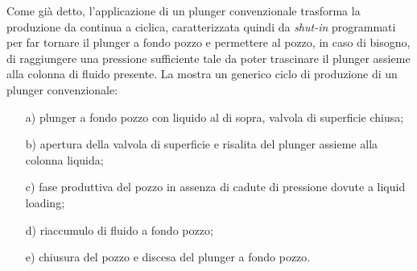 Come già detto, l'applicazione di un plunger convenzionale trasforma la produzione da continua a ciclica, caratterizzata quindi da \textit{shut-in} programmati per far tornare il plunger a fondo pozzo e permettere al pozzo, in caso di bisogno, di raggiungere una pressione sufficiente tale da poter trascinare il plunger assieme alla colonna di fluido presente. La  mostra un generico ciclo di produzione di un plunger convenzionale:
\begin{enumerate}
    \item[a)] plunger a fondo pozzo con liquido al di sopra, valvola di superficie chiusa;
    \item[b)] apertura della valvola di superficie e risalita del plunger assieme alla colonna liquida;
    \item[c)] fase produttiva del pozzo in assenza di cadute di pressione dovute a liquid loading;
    \item[d)] riaccumulo di fluido a fondo pozzo;
    \item[e)] chiusura del pozzo e discesa del plunger a fondo pozzo.
\end{enumerate}


